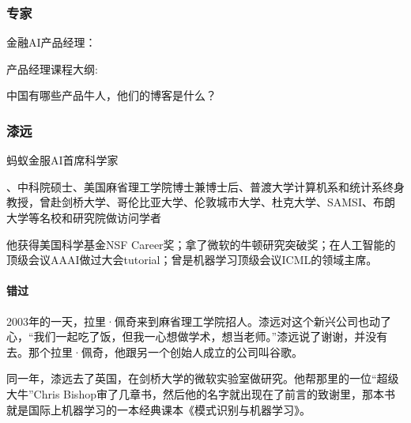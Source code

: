 \documentclass[letterpaper,10pt,english]{sphinxmanual}
\begin{document}
\subsubsection{专家}
\label{\detokenize{chapter_AI_expert/expert:id1}}\label{\detokenize{chapter_AI_expert/expert::doc}}

金融AI产品经理： 

产品经理课程大纲: 


中国有哪些产品牛人，他们的博客是什么？


\subsubsection{漆远}
\label{\detokenize{chapter_AI_expert/qi_yuan:id1}}\label{\detokenize{chapter_AI_expert/qi_yuan::doc}}
蚂蚁金服AI首席科学家%
\begin{footnote}[1081]\sphinxAtStartFootnote
{}
%
\end{footnote}、中科院硕士、美国麻省理工学院博士兼博士后、普渡大学计算机系和统计系终身教授，曾赴剑桥大学、哥伦比亚大学、伦敦城市大学、杜克大学、SAMSI、布朗大学等名校和研究院做访问学者

他获得美国科学基金NSF
Career奖；拿了微软的牛顿研究突破奖；在人工智能的顶级会议AAAI做过大会tutorial；曾是机器学习顶级会议ICML的领域主席。


\paragraph{错过}
\label{\detokenize{chapter_AI_expert/qi_yuan:id2}}
2003年的一天，拉里·佩奇来到麻省理工学院招人。漆远对这个新兴公司也动了心，“我们一起吃了饭，但我一心想做学术，想当老师。”漆远说了谢谢，并没有去。那个拉里·佩奇，他跟另一个创始人成立的公司叫谷歌。

同一年，漆远去了英国，在剑桥大学的微软实验室做研究。他帮那里的一位“超级大牛”Chris
Bishop审了几章书，然后他的名字就出现在了前言的致谢里，那本书就是国际上机器学习的一本经典课本《模式识别与机器学习》。
\end{document}
